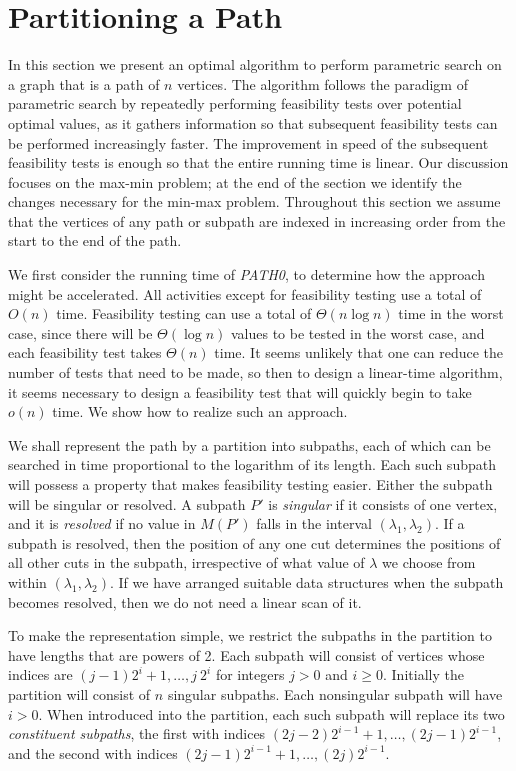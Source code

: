 \section{Partitioning a Path}
\label{sec:path}

In this section we present an optimal algorithm to perform
parametric search on a graph that is a path of $n$ vertices. 
The algorithm follows the paradigm of parametric search by repeatedly performing 
feasibility tests over potential optimal values, as it gathers 
information so that subsequent feasibility tests can be 
performed increasingly faster. The improvement in speed of the subsequent 
feasibility tests is enough so that the entire running time is linear.
Our discussion focuses on the max-min problem;
at the end of the section we identify the changes necessary
for the min-max problem.
Throughout this section we assume that the vertices of any path or subpath
are indexed in increasing order from the start to the end of the path.

We first consider the running time of {\it PATH0},
to determine how the approach might be accelerated.
All activities except for feasibility testing use a total of $O(n)$ time.
Feasibility testing can use a total of $\Theta (n \log n)$ time in the worst case,
since there will be $\Theta (\log n)$ values to be tested in the worst case,
and each feasibility test takes $\Theta (n)$ time.
It seems unlikely that one can reduce the number of tests that need to be made,
so then to design a linear-time algorithm,
it seems necessary to design a feasibility test that will quickly begin to take $o(n)$ time.
We show how to realize such an approach.

We shall represent the path by a partition into subpaths, each of which can be searched in time proportional to the logarithm of its length. 
Each such subpath will possess a property
that makes feasibility testing easier.
Either the subpath will be singular or resolved.
A subpath $P'$ is {\it singular} if it consists of one vertex,
and it is {\it resolved} if no value in $M(P')$ falls in the interval
$(\lambda_1, \lambda_2 )$.
If a subpath is resolved,
then the position of any one cut determines the positions
of all other cuts in the subpath,
irrespective of what value of $\lambda$ we choose from within
$(\lambda_1, \lambda_2 )$.
If we have arranged suitable data structures when the subpath becomes resolved,
then we do not need a linear scan of it.

To make the representation simple, we restrict the subpaths in the partition to have lengths that are powers of 2.
Each subpath will consist of vertices whose indices are
$(j-1)2^i+1, \ldots ,j\:2^i$ for integers $j>0$ and $i \geq 0$.
Initially the partition will consist of $n$ singular subpaths.
Each nonsingular subpath will have $i>0$.
When introduced into the partition,
each such subpath will replace its two {\it constituent subpaths},
the first with indices $(2j-2)2^{i-1}+1, \ldots ,(2j-1)2^{i-1}$,
and the second with indices $(2j-1)2^{i-1}+1, \ldots ,(2j)2^{i-1}$.

